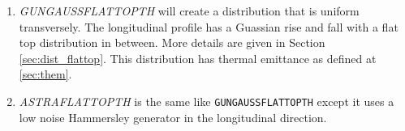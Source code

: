\begin{enumerate}
\item {\it GUNGAUSSFLATTOPTH} will create a distribution that is uniform
transversely. The longitudinal profile has a
Guassian rise and fall with a flat top distribution in between. More details are
given in Section \ref{sec:dist_flattop}. This distribution has thermal emittance as defined at \ref{sec:them}.

\item {\it ASTRAFLATTOPTH} is the same like {\tt GUNGAUSSFLATTOPTH} except it uses a low noise Hammersley generator in the longitudinal direction.

\end{enumerate}


